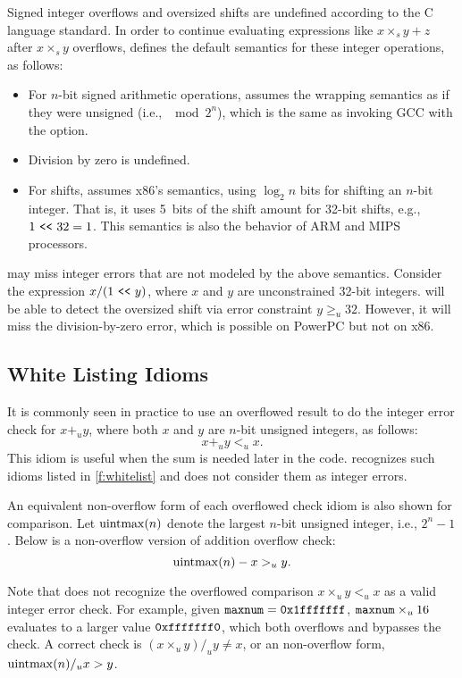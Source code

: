 Signed integer overflows and oversized shifts are undefined according
to the C language standard.  In order to continue evaluating
expressions like $x \times_s y + z$ after $x \times_s y$ overflows,
\sys defines the default semantics for these integer operations, as
follows:
\begin{itemize}
\item
For $n$-bit signed arithmetic operations, \sys assumes the wrapping
semantics as if they were unsigned (i.e., $\mod{2^n}$), which is
the same as invoking GCC with the  option.
\item
Division by zero is undefined.
\item
For shifts, \sys assumes x86's semantics, using $\log_2 n$ bits for
shifting an $n$-bit integer.  That is, it uses 5~bits of the shift
amount for 32-bit shifts, e.g., $1 \ \texttt{<}\texttt{<}\  32 = 1$.  This semantics
is also the behavior of ARM and MIPS processors.
\end{itemize}
\sys may miss integer errors that are not modeled by the above
semantics.  Consider the expression $x / (1 \ \texttt{<}\texttt{<}\  y)$, where $x$ and
$y$ are unconstrained 32-bit integers.  \sys will be able to detect
the oversized shift via error constraint $y \geq_u 32$.  However,
it will miss the division-by-zero error, which is possible on PowerPC
but not on x86.

\subsection{White Listing Idioms}
\label{s:sema:whitelist}

It is commonly seen in practice to use an overflowed result to do
the integer error check for $x +_u y$, where both $x$ and $y$ are
$n$-bit unsigned integers, as follows:
\begin{equation*}
x +_u y <_u x.
\end{equation*}
This idiom is useful when the sum is needed later in the code.
\sys recognizes such idioms listed in \autoref{f:whitelist} and
does not consider them as integer errors.

An equivalent non-overflow form of each overflowed check idiom is
also shown for comparison.  Let $\operatorname{uintmax}(n)$ denote the largest
$n$-bit unsigned integer, i.e., $2^n - 1$.  Below is a non-overflow
version of addition overflow check:
\begin{equation*}
\operatorname{uintmax}(n) - x >_u y.
\end{equation*}

Note that \sys does not recognize the overflowed comparison $x
\times_u y <_u x$ as a valid integer error check.  For example,
given $\texttt{maxnum} = \texttt{0x1fffffff}$, $\texttt{maxnum} \times_u 16$
evaluates to a larger value $\texttt{0xfffffff0}$, which both overflows
and bypasses the check.  A correct check is $(x \times_u y) /_u y
\neq x$, or an non-overflow form, $\operatorname{uintmax}(n) /_u x > y$.

